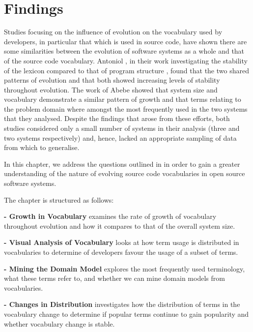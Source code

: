 \chapter{Findings} %
\label{cha:findings}
\vspace{-0.3cm}
Studies focusing on the influence of evolution on the vocabulary used by developers, in particular that which is used in source code, have shown there are some similarities between the evolution of software systems as a whole and that of the source code vocabulary. Antoniol \etal, in their work investigating the stability of the lexicon compared to that of program structure \cite{Antoniol07a}, found that the two shared patterns of evolution and that both showed increasing levels of stability throughout evolution. The work of Abebe \etal \cite{Abebe09a} showed that system size and vocabulary demonstrate a similar pattern of growth and that terms relating to the problem domain where amongst the most frequently used in the two systems that they analysed. Despite the findings that arose from these efforts, both studies considered only a small number of systems in their analysis (three and two systems respectively) and, hence, lacked an appropriate sampling of data from which to generalise.

In this chapter, we address the questions outlined in  in order to gain a greater understanding of the nature of evolving source code vocabularies in open source software systems.

The chapter is structured as follows:

\textbf{ - Growth in Vocabulary} examines the rate of growth of vocabulary throughout evolution and how it compares to that of the overall system size.

\textbf{ - Visual Analysis of Vocabulary} looks at how term usage is distributed in vocabularies to determine of developers favour the usage of a subset of terms.

\textbf{ - Mining the Domain Model} explores the most frequently used terminology, what these terms refer to, and whether we can mine domain models from vocabularies.

\textbf{ - Changes in Distribution} investigates how the distribution of terms in the vocabulary change to determine if popular terms continue to gain popularity and whether vocabulary change is stable.

